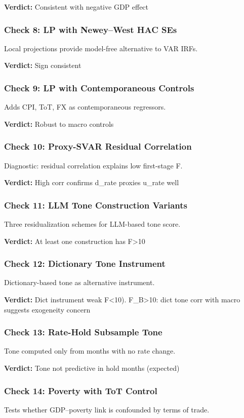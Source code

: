 \textbf{Verdict:} Consistent with negative GDP effect


\subsubsection{Check 8: LP with Newey--West HAC SEs}
Local projections provide model-free alternative to VAR IRFs.

\textbf{Verdict:} Sign consistent


\subsubsection{Check 9: LP with Contemporaneous Controls}
Adds CPI, ToT, FX as contemporaneous regressors.

\textbf{Verdict:} Robust to macro controls


\subsubsection{Check 10: Proxy-SVAR Residual Correlation}
Diagnostic: residual correlation explains low first-stage F.

\textbf{Verdict:} High corr confirms d_rate proxies u_rate well


\subsubsection{Check 11: LLM Tone Construction Variants}
Three residualization schemes for LLM-based tone score.

\textbf{Verdict:} At least one construction has F>10


\subsubsection{Check 12: Dictionary Tone Instrument}
Dictionary-based tone as alternative instrument.

\textbf{Verdict:} Dict instrument weak F<10). F_B>10: dict tone corr with macro suggests exogeneity concern


\subsubsection{Check 13: Rate-Hold Subsample Tone}
Tone computed only from months with no rate change.

\textbf{Verdict:} Tone not predictive in hold months (expected)


\subsubsection{Check 14: Poverty with ToT Control}
Tests whether GDP--poverty link is confounded by terms of trade.


